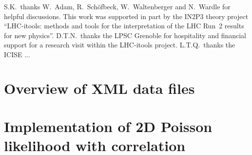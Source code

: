 \documentclass[submission, Phys]{SciPost}
\begin{document}
S.K.~thanks W.~Adam, R.~Sch\"ofbeck, W.~Waltenberger and N.~Wardle for helpful discussions. 
This work was supported in part by the IN2P3 theory project 
``LHC-itools: methods and tools for the interpretation of the LHC Run~2 results for new physics''. 
D.T.N.\ thanks the LPSC Grenoble for hospitality and financial support for a research visit within the LHC-itools project. 
L.T.Q.\ thanks the ICISE ...


\begin{appendix}

\section{Overview of XML data files}

\section{Implementation of 2D Poisson likelihood with correlation}


\end{appendix}





\nolinenumbers
\end{document}
